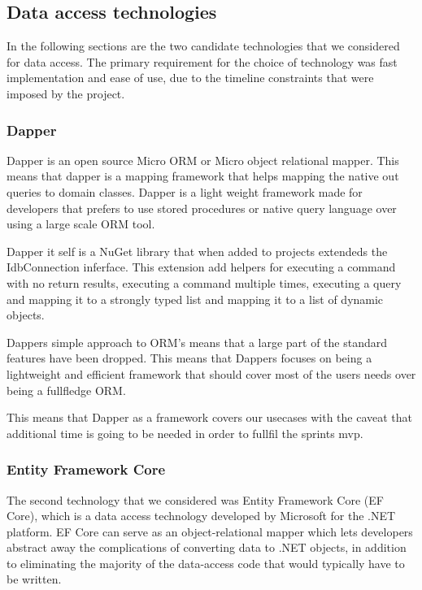 \subsection{Data access technologies}
In the following sections are the two candidate technologies that we considered for data access.
The primary requirement for the choice of technology was fast implementation and ease of use, due to the timeline constraints that were imposed by the \knox project. 

\subsubsection{Dapper}
Dapper is an open source Micro ORM or Micro object relational mapper. This means that dapper is a mapping framework that helps mapping the native out queries to domain classes. Dapper is a light weight framework made for developers that prefers to use stored procedures or native query language over using a large scale ORM tool. 

Dapper it self is a NuGet library that when added to projects extendeds the IdbConnection inferface. This extension add helpers for executing a command with no return results, executing a command multiple times, executing a query and mapping it to a strongly typed list and mapping it to a list of dynamic objects. \cite{Dapper_Git}

Dappers simple approach to ORM's means that a large part of the standard features have been dropped. This means that Dappers focuses on being a lightweight and efficient framework that should cover most of the users needs over being a fullfledge ORM.\cite{Dapper_Git} 

This means that Dapper as a framework covers our usecases with the caveat that additional time is going to be needed in order to fullfil the sprints mvp. 

\subsubsection{Entity Framework Core}
The second technology that we considered was Entity Framework Core (EF Core), which is a data access technology developed by Microsoft for the .NET platform. EF Core can serve as an object-relational mapper \cite{Object_relational_mapping} which lets developers abstract away the complications of converting data to .NET objects, in addition to eliminating the majority of the data-access code that would typically have to be written.

